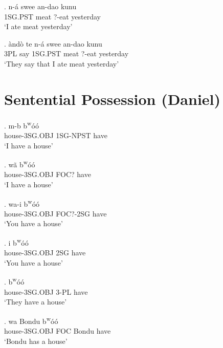 \documentclass{assets/fieldnotes}
\begin{document}
\exg.  n-á swee an-dao kunu\\
1SG.PST meat ?-eat yesterday\\
    `I ate meat yesterday'\\


\exg.  àndò te n-á swee an-dao kunu\\
3PL say 1SG.PST meat ?-eat yesterday\\
    `They say that I ate meat yesterday'\\



\section{Sentential Possession (Daniel)}

\exg.  m-b b\textsuperscript{w}óó\\
house-3SG.OBJ 1SG-NPST have\\
`I have a house' 

\exg.  wã b\textsuperscript{w}óó\\
house-3SG.OBJ FOC? have\\
`I have a house' \label{2sgex}

\ex.  wa-i b\textsuperscript{w}óó\\
house-3SG.OBJ FOC?-2SG have\\
`You have a house'

\exg.  i b\textsuperscript{w}óó\\
house-3SG.OBJ 2SG have\\
`You have a house'

\exg.   b\textsuperscript{w}óó\\
house-3SG.OBJ 3-PL have\\
`They have a house' 

\exg.  wa Bondu b\textsuperscript{w}óó\\
house-3SG.OBJ FOC Bondu have\\
`Bondu has a house'
\end{document}
